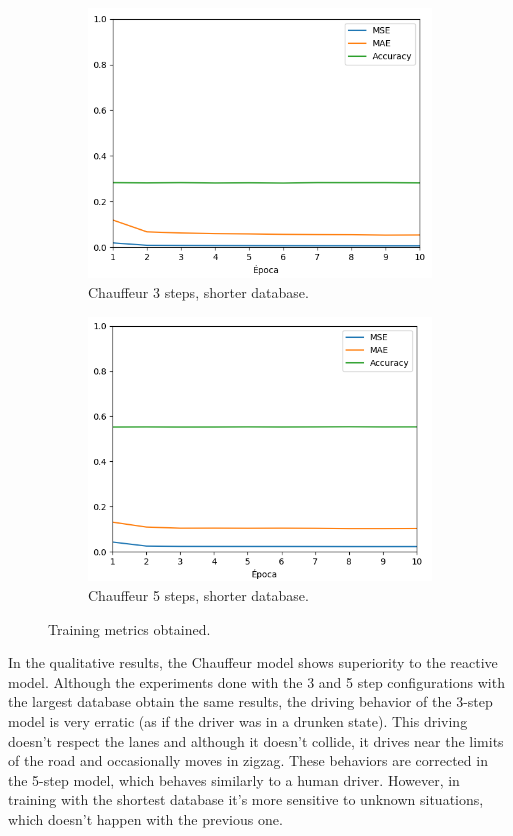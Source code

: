 \documentclass[conference]{IEEEtran}
\begin{document}
\begin{figure}[h]
\begin{subfigure}{0.24\textwidth}
		\includegraphics[width=\textwidth]{img/chauffeur3m}
		\caption{Chauffeur 3 steps, shorter database.} 
		\label{subfig:5}
	\end{subfigure}
	\begin{subfigure}{0.24\textwidth} 
		\includegraphics[width=\textwidth]{img/chauffeur5m}
		\caption{Chauffeur 5 steps, shorter database.} 
		\label{subfig:6}
	\end{subfigure}
	\caption{Training metrics obtained.} 
	\label{fig:pilottest}
\end{figure}

In the qualitative results, the Chauffeur model shows superiority to the reactive model. Although the experiments done with the 3 and 5 step configurations with the largest database obtain the same results, the driving behavior of the 3-step model is very erratic (as if the driver was in a drunken state). This driving doesn't respect the lanes and although it doesn't collide, it drives near the limits of the road and occasionally moves in zigzag. These behaviors are corrected in the 5-step model, which behaves similarly to a human driver. However, in training with the shortest database it's more sensitive to unknown situations, which doesn't happen with the previous one.
\end{document}
